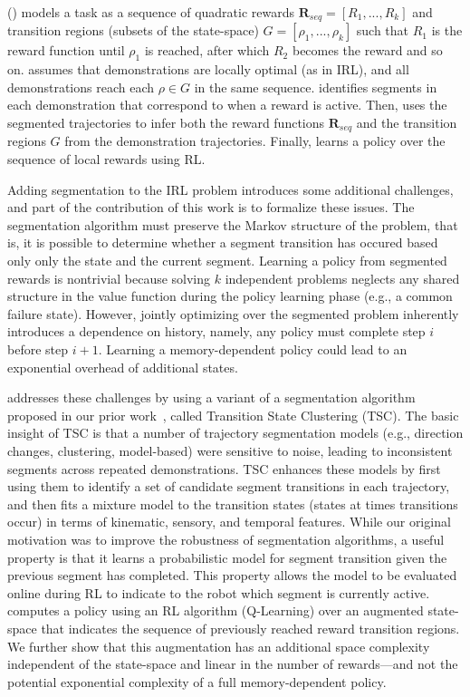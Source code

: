 \hirlfull (\hirl) models a task as a sequence of quadratic rewards $\mathbf{R}_{seq}=[R_1,...,R_k]$ and transition regions (subsets of the state-space) $G = [\rho_1, ...,\rho_k]$ such that $R_1$ is the reward function until $\rho_1$ is reached, after which $R_2$ becomes the reward and so on.
\hirl assumes that demonstrations are locally optimal (as in IRL), and all demonstrations reach each $\rho \in G$ in the same sequence.
\hirl identifies segments in each demonstration that correspond to when a reward is active.
Then, \hirl uses the segmented trajectories to infer both the reward functions $\mathbf{R}_{seq}$ and the transition regions $G$ from the demonstration trajectories.
Finally, \hirl learns a policy over the sequence of local rewards using RL.

Adding segmentation to the IRL problem introduces some additional challenges, and part of the contribution of this work is to formalize these issues.
The segmentation algorithm must preserve the Markov structure of the problem, that is, it is possible to determine whether a segment transition has occured based only only the state and the current segment.
Learning a policy from segmented rewards is nontrivial because solving $k$ independent problems neglects any shared structure in the value function during the policy learning phase (e.g., a common failure state).
However, jointly optimizing over the segmented problem inherently introduces a dependence on history, namely, any policy must complete step $i$ before step $i+1$.
Learning a memory-dependent policy could lead to an exponential overhead of additional states. 

\hirl addresses these challenges by using a variant of a segmentation algorithm proposed in our prior work~\cite{krishnan2015tsc,murali2016}, called Transition State Clustering (TSC). The basic insight of TSC is that a number of trajectory segmentation models (e.g., direction changes, clustering, model-based) were sensitive to noise, leading to inconsistent segments across repeated demonstrations.
TSC enhances these models by first using them to identify a set of candidate segment transitions in each trajectory, and then fits a mixture model to the transition states (states at times transitions occur) in terms of kinematic, sensory, and temporal features. 
While our original motivation was to improve the robustness of segmentation algorithms, a useful property is that it learns a probabilistic model for segment transition given the previous segment has completed.
This property allows the model to be evaluated online during RL to indicate to the robot which segment is currently active.
\hirl computes a policy using an RL algorithm (Q-Learning) over an augmented state-space that indicates the sequence of previously reached reward transition regions. We further show that this augmentation has an additional space complexity independent of the state-space and linear in the number of rewards---and not the potential exponential complexity of a full memory-dependent policy.

